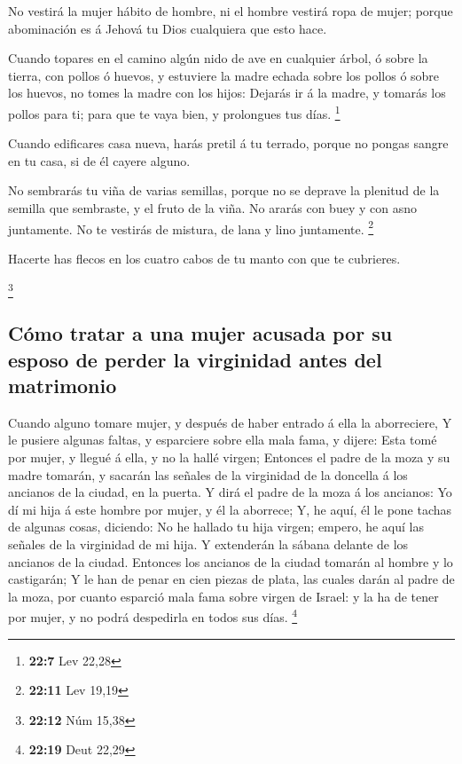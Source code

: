  No vestirá la mujer hábito de hombre, ni el hombre
vestirá ropa de mujer; porque abominación es á Jehová tu Dios cualquiera
que esto hace.

 Cuando topares en el camino algún nido de ave en
cualquier árbol, ó sobre la tierra, con pollos ó huevos, y estuviere la
madre echada sobre los pollos ó sobre los huevos, no tomes la madre con
los hijos:  Dejarás ir á la madre, y tomarás los pollos
para ti; para que te vaya bien, y prolongues tus días. \footnote{\textbf{22:7}
  Lev 22,28}

 Cuando edificares casa nueva, harás pretil á tu terrado,
porque no pongas sangre en tu casa, si de él cayere alguno.

 No sembrarás tu viña de varias semillas, porque no se
deprave la plenitud de la semilla que sembraste, y el fruto de la viña.
 No ararás con buey y con asno juntamente.
 No te vestirás de mistura, de lana y lino juntamente.
\footnote{\textbf{22:11} Lev 19,19}

 Hacerte has flecos en los cuatro cabos de tu manto con
que te cubrieres.

\footnote{\textbf{22:12} Núm 15,38}

\hypertarget{cuxf3mo-tratar-a-una-mujer-acusada-por-su-esposo-de-perder-la-virginidad-antes-del-matrimonio}{%
\subsection{Cómo tratar a una mujer acusada por su esposo de perder la
virginidad antes del
matrimonio}\label{cuxf3mo-tratar-a-una-mujer-acusada-por-su-esposo-de-perder-la-virginidad-antes-del-matrimonio}}

 Cuando alguno tomare mujer, y después de haber entrado á
ella la aborreciere,  Y le pusiere algunas faltas, y
esparciere sobre ella mala fama, y dijere: Esta tomé por mujer, y llegué
á ella, y no la hallé virgen;  Entonces el padre de la
moza y su madre tomarán, y sacarán las señales de la virginidad de la
doncella á los ancianos de la ciudad, en la puerta.  Y
dirá el padre de la moza á los ancianos: Yo dí mi hija á este hombre por
mujer, y él la aborrece;  Y, he aquí, él le pone tachas
de algunas cosas, diciendo: No he hallado tu hija virgen; empero, he
aquí las señales de la virginidad de mi hija. Y extenderán la sábana
delante de los ancianos de la ciudad.  Entonces los
ancianos de la ciudad tomarán al hombre y lo castigarán; 
Y le han de penar en cien piezas de plata, las cuales darán al padre de
la moza, por cuanto esparció mala fama sobre virgen de Israel: y la ha
de tener por mujer, y no podrá despedirla en todos sus días. \footnote{\textbf{22:19}
  Deut 22,29}

